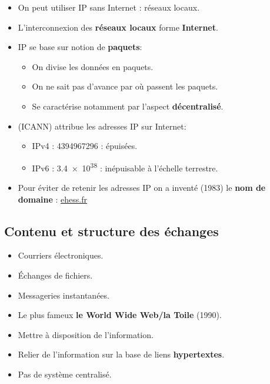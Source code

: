 \begin{slide}
	\begin{itemize}
		\item On peut utiliser IP sans Internet : réseaux locaux.
		\item L'interconnexion des \textbf{réseaux locaux} forme \textbf{Internet}.
		\item IP se base sur notion de \textbf{paquets}:
			\begin{itemize}
				\item On divise les données en paquets.
				\item On ne sait pas d'avance par où passent les paquets.
				\item Se caractérise notamment par l'aspect \textbf{décentralisé}.
			\end{itemize}
		\item {} (ICANN) attribue les adresses IP sur Internet:
			\begin{itemize}
				\item IPv4 : \num{4394967296} : épuisées.
				\item IPv6 : \num{3,4e38} : inépuisable à l'échelle terrestre. 

			\end{itemize}
		\item Pour éviter de retenir les adresses IP on a inventé (1983) le \textbf{nom de domaine} : \url{ehess.fr}
	\end{itemize}
\end{slide}


\subsection{Contenu et structure des échanges} 

\begin{slide}
	\begin{itemize}
		\item Courriers électroniques.
		\item Échanges de fichiers.
		\item Messageries instantanées.
		\item Le plus fameux \textbf{le World Wide Web/la Toile} (1990).
	\end{itemize}
\end{slide}


\begin{slide}
	\begin{itemize}
		\item Mettre à disposition de l'information.
		\item Relier de l'information sur la base de liens \textbf{hypertextes}.
		\item Pas de système centralisé.
	\end{itemize}
\end{slide}

